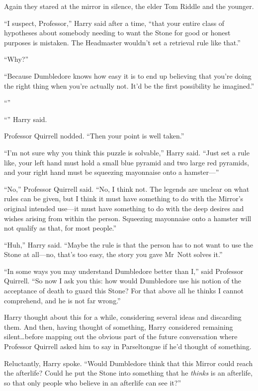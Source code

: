 Again they stared at the mirror in silence, the elder Tom Riddle and the
younger.

“I suspect, Professor,” Harry said after a time, “that your entire class of
hypotheses about somebody needing to want the Stone for good or honest purposes
is mistaken. The Headmaster wouldn’t set a retrieval rule like that.”

“Why?”

“Because Dumbledore knows how easy it is to end up believing that you’re doing
the right thing when you’re actually not. It’d be the first possibility he
imagined.”

“”

“” Harry said.

Professor Quirrell nodded. “Then your point is well taken.”

“I’m not sure why you think this puzzle is solvable,” Harry said. “Just set a
rule like, your left hand must hold a small blue pyramid and two large red
pyramids, and your right hand must be squeezing mayonnaise onto a hamster—”

“No,” Professor Quirrell said. “No, I think not. The legends are unclear on
what rules can be given, but I think it must have something to do with the
Mirror’s original intended use—it must have something to do with the deep
desires and wishes arising from within the person. Squeezing mayonnaise onto a
hamster will not qualify as that, for most people.”

“Huh,” Harry said. “Maybe the rule is that the person has to not want to use
the Stone at all—no, that’s too easy, the story you gave Mr~Nott solves it.”

“In some ways you may understand Dumbledore better than I,” said Professor
Quirrell. “So now I ask you this: how would Dumbledore use his notion of the
acceptance of death to guard this Stone? For that above all he thinks I cannot
comprehend, and he is not far wrong.”

Harry thought about this for a while, considering several ideas and discarding
them. And then, having thought of something, Harry considered remaining
silent…before mapping out the obvious part of the future conversation
where Professor Quirrell asked him to say in Parseltongue if he’d thought of
something.

Reluctantly, Harry spoke. “Would Dumbledore think that this Mirror could reach
the afterlife? Could he put the Stone into something that he \emph{thinks} is
an afterlife, so that only people who believe in an afterlife can see it?”


